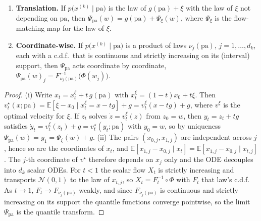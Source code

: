\begin{lemma}
\label{lem:fm-maps}
\begin{enumerate}
  \item[(i)] \textbf{Translation.} If $p\bigl(x^{(k)} \mid \mathrm{pa}\bigr)$ is the law of
  $g(\mathrm{pa}) + \xi$ with the law of $\xi$ not depending on $\mathrm{pa}$, then
  $\Psi_{\mathrm{pa}}(w) = g(\mathrm{pa}) + \Psi_\xi(w)$, where $\Psi_\xi$ is the flow-matching
  map for the law of $\xi$.
  \item[(ii)] \textbf{Coordinate-wise.} If $p\bigl(x^{(k)} \mid \mathrm{pa}\bigr)$ is a
  product of laws $\nu_{j}(\mathrm{pa})$, $j = 1,\dots,d_k$, each with a c.d.f.\ that is
  continuous and strictly increasing on its (interval) support, then $\Psi_{\mathrm{pa}}$ acts coordinate by coordinate,
  $\Psi_{\mathrm{pa}}(w)_j = F^{-1}_{\nu_j(\mathrm{pa})}\bigl(\Phi(w_j)\bigr)$.
\end{enumerate}
\end{lemma}

\begin{proof}
(i) Write $x_t = x^\xi_t + t\,g(\mathrm{pa})$ with $x^\xi_t = (1-t)x_0 + t\xi$. Then
$v^\star_t(x;\mathrm{pa}) = \mathbb{E}[\xi - x_0 \mid x^\xi_t = x - t g] + g
= v^{\xi}_t(x - t g) + g$, where $v^\xi$ is the optimal velocity for $\xi$. If $z_t$ solves
$\dot z = v^\xi_t(z)$ from $z_0 = w$, then $y_t = z_t + t g$ satisfies
$\dot y_t = v^\xi_t(z_t) + g = v^\star_t(y_t;\mathrm{pa})$ with $y_0 = w$, so by uniqueness
$\Psi_{\mathrm{pa}}(w) = y_1 = \Psi_\xi(w) + g$.
(ii) The pairs $(x_{0,j}, x_{1,j})$ are independent across $j$, hence so are the coordinates
of $x_t$, and $\mathbb{E}[x_{1,j} - x_{0,j} \mid x_t] = \mathbb{E}[x_{1,j} - x_{0,j} \mid
x_{t,j}]$. The $j$-th coordinate of $v^\star$ therefore depends on $x_j$ only and the ODE
decouples into $d_k$ scalar ODEs. For $t<1$ the scalar flow $X_t$ is strictly increasing and
transports $\mathcal{N}(0,1)$ to the law of $x_{t,j}$, so $X_t = F_t^{-1}\circ\Phi$ with $F_t$
that law's c.d.f. As $t\to1$, $F_t \to F_{\nu_j(\mathrm{pa})}$ weakly, and since
$F_{\nu_j(\mathrm{pa})}$ is continuous and strictly increasing on its support the quantile
functions converge pointwise, so the limit $\Psi_{\mathrm{pa}}$ is the quantile transform.
\end{proof}

